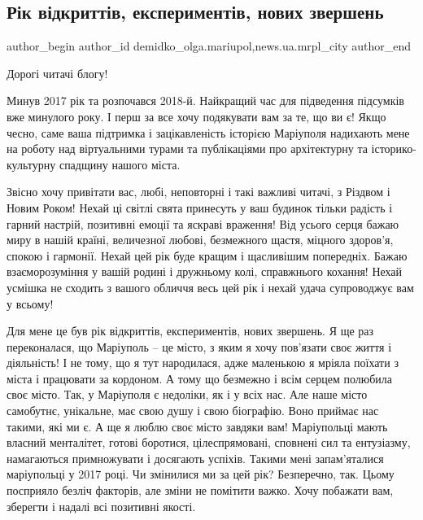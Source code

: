 
 
 
 
 
 
\subsection{Рік відкриттів, експериментів, нових звершень}
\label{sec:05_01_2018.stz.news.ua.mrpl_city.1.rik}
 
\ifcmt
 author_begin
   author_id demidko_olga.mariupol,news.ua.mrpl_city
 author_end
\fi

Дорогі читачі блогу!

Минув 2017 рік та розпочався 2018-й. Найкращий час для підведення підсумків вже
минулого року. І перш за все хочу подякувати вам за те, що ви є! Якщо чесно,
саме ваша підтримка і зацікавленість історією Маріуполя надихають мене на
роботу над віртуальними турами та публікаціями про архітектурну та
історико-культурну спадщину нашого міста.

Звісно хочу привітати вас, любі, неповторні і такі важливі читачі, з Різдвом і
Новим Роком! Нехай ці світлі свята принесуть у ваш будинок тільки радість і
гарний настрій, позитивні емоції та яскраві враження! Від усього серця бажаю
миру в нашій країні, величезної любові, безмежного щастя, міцного здоров'я,
спокою і гармонії. Нехай цей рік буде кращим і щасливішим попередніх. Бажаю
взаєморозуміння у вашій родині і дружньому колі, справжнього кохання! Нехай
усмішка не сходить з вашого обличчя весь цей рік і нехай удача супроводжує вам
у всьому!

Для мене це був рік відкриттів, експериментів, нових звершень. Я ще раз
переконалася, що Маріуполь – це місто, з яким я хочу пов'язати своє життя і
діяльність! І не тому, що я тут народилася, адже маленькою я мріяла поїхати з
міста і працювати за кордоном. А тому що безмежно і всім серцем полюбила своє
місто. Так, у Маріуполя є недоліки, як і у всіх нас. Але наше місто самобутнє,
унікальне, має свою душу і свою біографію. Воно приймає нас такими, які ми є. А
ще я люблю своє місто завдяки вам! Маріупольці мають власний менталітет, готові
боротися, цілеспрямовані, сповнені сил та ентузіазму, намагаються примножувати
і досягають успіхів. Такими мені запам'яталися маріупольці у 2017 році. Чи
змінилися ми за цей рік? Безперечно, так. Цьому посприяло безліч факторів, але
зміни не помітити важко. Хочу побажати вам, зберегти і надалі всі позитивні
якості.

